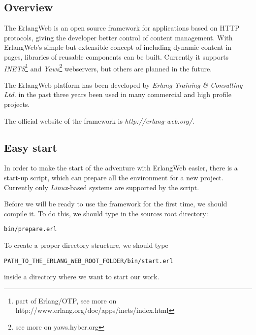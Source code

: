 \subsection{Overview} The ErlangWeb is an open source framework for applications based on HTTP protocols, giving the developer better control of content management. With ErlangWeb's simple but extensible concept of including dynamic content in pages, libraries of reusable components can be built. Currently it supports {\it INETS}\footnote{part of Erlang/OTP, see more on http://www.erlang.org/doc/apps/inets/index.html} and {\it Yaws}\footnote{see more on yaws.hyber.org} webservers, but others are planned in the future.

The ErlangWeb platform has been developed by {\it Erlang Training \& Consulting Ltd.} in the past three years been used in many commercial and high profile projects.

The official website of the framework is {\it http://erlang-web.org/}.

\subsection{Easy start}In order to make the start of the adventure with ErlangWeb easier, there is a start-up script, which can prepare all the environment for a new project. Currently only {\it Linux}-based systems are supported by the script. 

Before we will be ready to use the framework for the first time, we should compile it. To do this, we should type in the sources root directory:
\begin{verbatim}
bin/prepare.erl
\end{verbatim}

To create a proper directory structure, we should type 
\begin{verbatim}
PATH_TO_THE_ERLANG_WEB_ROOT_FOLDER/bin/start.erl
\end{verbatim}
inside a directory where we want to start our work. 

